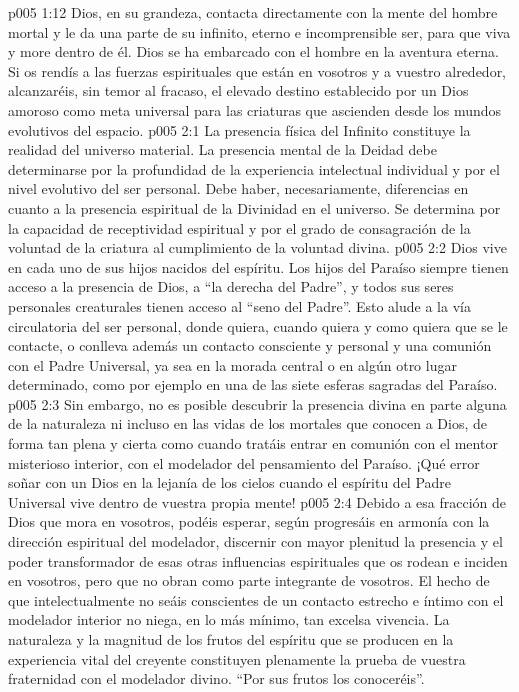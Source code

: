 \vs p005 1:12 Dios, en su grandeza, contacta directamente con la mente del hombre mortal y le da una parte de su infinito, eterno e incomprensible ser, para que viva y more dentro de él. Dios se ha embarcado con el hombre en la aventura eterna. Si os rendís a las fuerzas espirituales que están en vosotros y a vuestro alrededor, alcanzaréis, sin temor al fracaso, el elevado destino establecido por un Dios amoroso como meta universal para las criaturas que ascienden desde los mundos evolutivos del espacio.
\vs p005 2:1 La presencia física del Infinito constituye la realidad del universo material. La presencia mental de la Deidad debe determinarse por la profundidad de la experiencia intelectual individual y por el nivel evolutivo del ser personal. Debe haber, necesariamente, diferencias en cuanto a la presencia espiritual de la Divinidad en el universo. Se determina por la capacidad de receptividad espiritual y por el grado de consagración de la voluntad de la criatura al cumplimiento de la voluntad divina.
\vs p005 2:2 Dios vive en cada uno de sus hijos nacidos del espíritu. Los hijos del Paraíso siempre tienen acceso a la presencia de Dios, a “la derecha del Padre”, y todos sus seres personales creaturales tienen acceso al “seno del Padre”. Esto alude a la vía circulatoria del ser personal, donde quiera, cuando quiera y como quiera que se le contacte, o conlleva además un contacto consciente y personal y una comunión con el Padre Universal, ya sea en la morada central o en algún otro lugar determinado, como por ejemplo en una de las siete esferas sagradas del Paraíso.
\vs p005 2:3 Sin embargo, no es posible descubrir la presencia divina en parte alguna de la naturaleza ni incluso en las vidas de los mortales que conocen a Dios, de forma tan plena y cierta como cuando tratáis entrar en comunión con el mentor misterioso interior, con el modelador del pensamiento del Paraíso. ¡Qué error soñar con un Dios en la lejanía de los cielos cuando el espíritu del Padre Universal vive dentro de vuestra propia mente!
\vs p005 2:4 \pc Debido a esa fracción de Dios que mora en vosotros, podéis esperar, según progresáis en armonía con la dirección espiritual del modelador, discernir con mayor plenitud la presencia y el poder transformador de esas otras influencias espirituales que os rodean e inciden en vosotros, pero que no obran como parte integrante de vosotros. El hecho de que intelectualmente no seáis conscientes de un contacto estrecho e íntimo con el modelador interior no niega, en lo más mínimo, tan excelsa vivencia. La naturaleza y la magnitud de los frutos del espíritu que se producen en la experiencia vital del creyente constituyen plenamente la prueba de vuestra fraternidad con el modelador divino. “Por sus frutos los conoceréis”.
